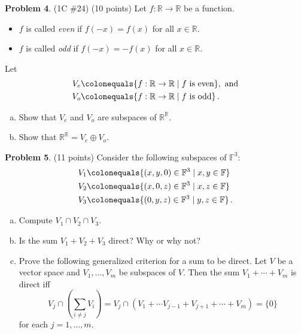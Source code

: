 \documentclass[reqno, 12pt]{amsart}
\theoremstyle{definition}
\newenvironment{problab}[1]
{\noindent\textbf{Problem #1}.}
{\vskip 6pt}
\theoremstyle{remark}
\newcommand{\F}{\mathbb F}
\newcommand{\R}{\mathbb R}
\begin{document}
\begin{problab}{4} (1C \#24) (10 points) %
  Let $f: \R \to \R$ be a function.
  \begin{itemize}
    \item $f$ is called \textit{even} if $f(-x) = f(x)$ for all $x \in \R$.
    \item $f$ is called \textit{odd} if $f(-x) = -f(x)$ for all $x \in \R$.
  \end{itemize}
  Let
  \begin{align*}
    V_e &\colonequals \{f: \R \to \R \mid \text{$f$ is even}\}, \ \text{and}\\
    V_o &\colonequals \{f: \R \to \R \mid \text{$f$ is odd}\} \, .
  \end{align*}
  \begin{enumerate}[(a)]
    \item 
      Show that $V_e$ and $V_o$ are subspaces of $\R^{\R}$.
    \item
      Show that $\R^{\R} = V_e \oplus V_o$.
  \end{enumerate}
\end{problab}

\begin{problab}{5} (11 points)
  Consider the following subspaces of $\F^3$:
  \begin{align*}
    V_1 &\colonequals \{(x,y,0) \in \F^3 \mid x,y \in \F\}\\
    V_2 &\colonequals \{(x,0,z) \in \F^3 \mid x,z \in \F\}\\
    V_3 &\colonequals \{(0,y,z) \in \F^3 \mid y,z \in \F\} \, .
  \end{align*}
  \begin{enumerate}[(a)]
    \item Compute $V_1 \cap V_2 \cap V_3$.
    \item Is the sum $V_1 + V_2 + V_3$ direct? Why or why not?
    \item Prove the following generalized criterion for a sum to be direct. Let $V$ be a vector space and $V_1, \ldots, V_m$ be subspaces of $V$. Then the sum $V_1 + \cdots + V_m$ is direct iff
      \begin{equation*}
        V_j \cap \left( \sum_{i \neq j} V_i \right) = V_j \cap \left(V_1 + \cdots V_{j-1} + V_{j+1} + \cdots + V_m \right) = \{0\}
      \end{equation*}
      for each $j = 1, \ldots, m$.
  \end{enumerate}
\end{problab}
\end{document}
